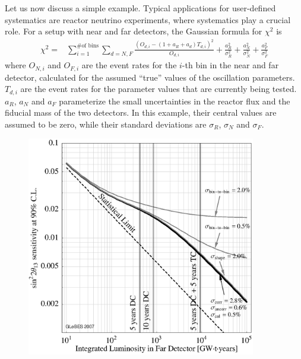 Let us now discuss a simple example.  Typical applications for user-defined systematics are reactor neutrino experiments, where systematics play a crucial role. For a setup with near and far detectors,
the Gaussian formula for $\chi^2$ is
\begin{align}
  \chi^2 =& \sum_{i=1}^{\textrm{\# of bins}} \sum_{d = N,F} 
     \frac{\left( O_{d,i} - (1 + a_R + a_d) T_{d,i} \right)^2 }{O_{d,i}} + \frac{a_R^2}{\sigma_R^2} + \frac{a_N^2}{\sigma_N^2} + \frac{a_F^2}{\sigma_F^2}
\label{equ:chi2reactor}
\end{align}
where $O_{N,i}$ and $O_{F,i}$ are the event rates for the $i$-th bin in the near and
far detector, calculated for the assumed ``true'' values of the oscillation parameters.
$T_{d,i}$ are the event rates for the parameter values that are currently being tested.
$a_R$, $a_N$ and $a_F$ parameterize the small uncertainties in the reactor flux and the fiducial
mass of the two detectors. In this example, their central values are assumed to be zero,
while their standard deviations are $\sigma_R$, $\sigma_N$ and $\sigma_F$.
%
\begin{figure}[t]
\begin{center}
\includegraphics[width=10cm]{reactor}
\end{center}
\end{figure}
